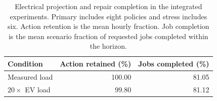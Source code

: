 \begin{table}[t]
\centering
\caption{Electrical projection and repair completion in the integrated experiments. Primary includes eight policies and stress includes six. Action retention is the mean hourly fraction. Job completion is the mean scenario fraction of requested jobs completed within the horizon.}
\label{tab:integrated-execution}
\footnotesize
\setlength{\tabcolsep}{3pt}
\vspace{3pt}
\begin{tabular}{@{}lrr@{}}
\toprule
Condition & Action retained (\%) & Jobs completed (\%) \\
\midrule
Measured load & 100.00 & 81.05 \\
$20\times$ EV load & 99.80 & 81.12 \\
\bottomrule
\end{tabular}
\end{table}
